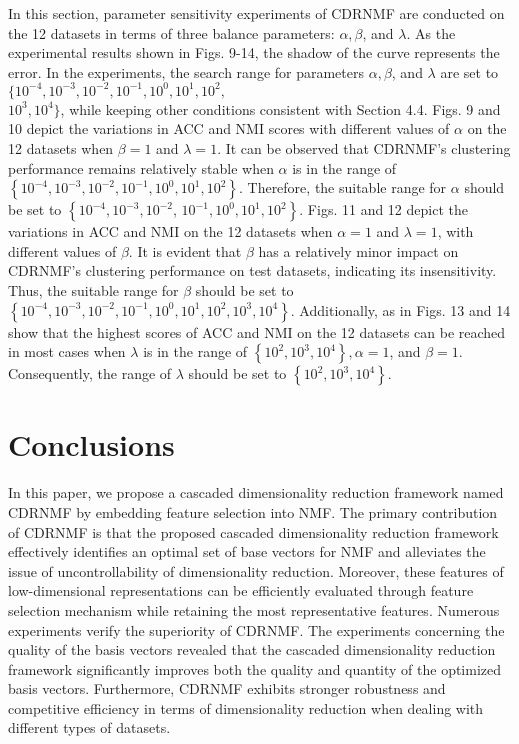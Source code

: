 \documentclass[a4paper,fleqn]{cas-sc}
\begin{document}
In this section, parameter sensitivity experiments of CDRNMF are conducted on the 12 datasets in terms of three balance parameters: $\alpha, \beta$, and $\lambda$. As the experimental results shown in Figs. 9-14, the shadow of the curve represents the error. In the experiments, the search range for parameters $\alpha, \beta$, and $\lambda$ are set to $\{10^{-4}, 10^{-3}, 10^{-2}, 10^{-1}, 10^0, 10^1, 10^2,$\\ $10^3, 10^4\}$, while keeping other conditions consistent with Section 4.4. Figs. 9 and 10 depict the variations in ACC and NMI scores with different values of $\alpha$ on the 12 datasets when $\beta=1$ and $\lambda=1$. It can be observed that CDRNMF's clustering performance remains relatively stable when $\alpha$ is in the range of $\left\{10^{-4}, 10^{-3}, 10^{-2}, 10^{-1}, 10^0, 10^1, 10^2\right\}$. Therefore, the suitable range for $\alpha$ should be set to $\left\{10^{-4}, 10^{-3}, 10^{-2}\right.$, $\left.10^{-1}, 10^0, 10^1, 10^2\right\}$. Figs. 11 and 12 depict the variations in ACC and NMI on the 12 datasets when $\alpha=1$ and $\lambda=1$, with different values of $\beta$. It is evident that $\beta$ has a relatively minor impact on CDRNMF's clustering performance on test datasets, indicating its insensitivity. Thus, the suitable range for $\beta$ should be set to $\left\{10^{-4}, 10^{-3}, 10^{-2}, 10^{-1}, 10^0, 10^1, 10^2, 10^3, 10^4\right\}$. Additionally, as in Figs. 13 and 14 show that the highest scores of ACC and NMI on the 12 datasets can be reached in most cases when $\lambda$ is in the range of $\left\{10^2, 10^3, 10^4\right\}, \alpha=1$, and $\beta=1$. Consequently, the range of $\lambda$ should be set to $\left\{10^2, 10^3, 10^4\right\}$.








\section{Conclusions}

In this paper, we propose a cascaded dimensionality reduction framework named CDRNMF by embedding feature selection into NMF. The primary contribution of CDRNMF is that the proposed cascaded dimensionality reduction framework effectively identifies an optimal set of base vectors for NMF and alleviates the issue of uncontrollability of dimensionality reduction. Moreover, these features of low-dimensional representations can be efficiently evaluated through feature selection mechanism while retaining the most representative features. Numerous experiments verify the superiority of CDRNMF. The experiments concerning the quality of the basis vectors revealed that the cascaded dimensionality reduction framework significantly improves both the quality and quantity of the optimized basis vectors. Furthermore, CDRNMF exhibits stronger robustness and competitive efficiency in terms of dimensionality reduction when dealing with different types of datasets.
\end{document}
